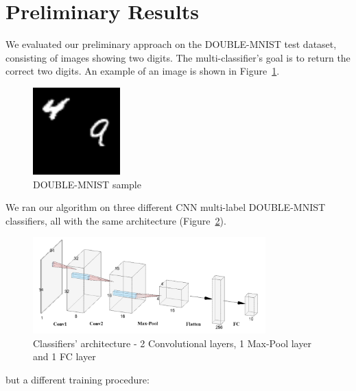 
\section{Preliminary Results}
We evaluated our preliminary approach on the DOUBLE-MNIST test dataset, consisting of images showing two digits. The multi-classifier's goal is to return the correct two digits. %
An example of an image is shown in Figure~\ref{fig:double-mnist-sample}. %
\begin{figure}
    \centering
    \includegraphics[width=0.3\textwidth]{3.png}
    \caption{DOUBLE-MNIST sample}
    \label{fig:double-mnist-sample}
\end{figure}
We ran our algorithm on three different CNN multi-label DOUBLE-MNIST classifiers, all with the same architecture (Figure~\ref{fig:arch_labeled}).
\begin{figure}
    \centering
    \includegraphics[width=0.8\textwidth]{arch_labeled.png}
    \caption{Classifiers' architecture - 2 Convolutional layers, 1 Max-Pool layer and 1 FC layer}
    \label{fig:arch_labeled}
\end{figure}
but a different training procedure:
